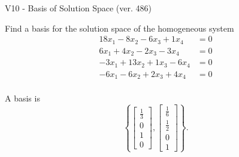 \begin{exercise}
  \begin{exerciseTitle}V10 - Basis of Solution Space (ver. 486)\end{exerciseTitle}
  \begin{exerciseStatement}
    Find a basis for the solution space of the homogeneous system 
\begin{align*}
 18 x_ 1 -8 x_ 2 -6 x_ 3 + 1 x_ 4 &= 0  \\ 
  6 x_ 1 + 4 x_ 2 -2 x_ 3 -3 x_ 4 &= 0  \\ 
  -3 x_ 1 + 13 x_ 2 + 1 x_ 3 -6 x_ 4 &= 0  \\ 
  -6 x_ 1 -6 x_ 2 + 2 x_ 3 + 4 x_ 4 &= 0  \\ 
 \end{align*}


 
  \end{exerciseStatement}

  \begin{exerciseAnswer}
   A basis is   
\[\left\{\left[\begin{array}{c}
\frac{1}{3} \\
0 \\
1 \\
0
\end{array}\right] , \left[\begin{array}{c}
\frac{1}{6} \\
\frac{1}{2} \\
0 \\
1
\end{array}\right]\right\}.\]

  


  \end{exerciseAnswer}
\end{exercise}